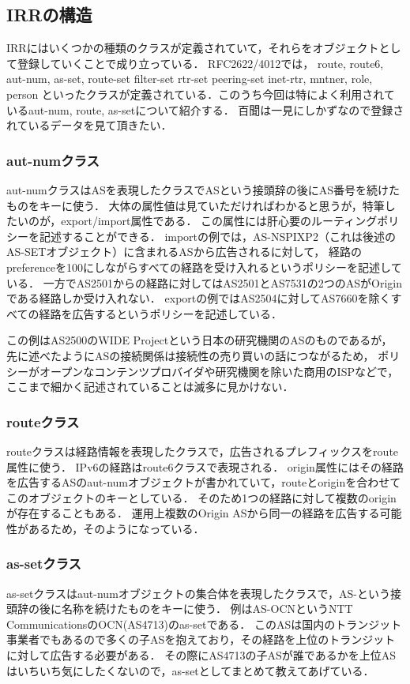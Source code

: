 \subsection{IRRの構造}

IRRにはいくつかの種類のクラスが定義されていて，それらをオブジェクトとして登録していくことで成り立っている．
RFC2622/4012では，
route, route6, aut-num, as-set, route-set filter-set rtr-set peering-set inet-rtr, mntner, role, person
といったクラスが定義されている．このうち今回は特によく利用されているaut-num, route, as-setについて紹介する．
百聞は一見にしかずなので登録されているデータを見て頂きたい．

\subsubsection{aut-numクラス}
aut-numクラスはASを表現したクラスでASという接頭辞の後にAS番号を続けたものをキーに使う．
大体の属性値は見ていただければわかると思うが，特筆したいのが，export/import属性である．
この属性には肝心要のルーティングポリシーを記述することができる．
importの例では，AS-NSPIXP2（これは後述のAS-SETオブジェクト）に含まれるASから広告されるに対して，
経路のpreferenceを100にしながらすべての経路を受け入れるというポリシーを記述している．
一方でAS2501からの経路に対してはAS2501とAS7531の2つのASがOriginである経路しか受け入れない．
exportの例ではAS2504に対してAS7660を除くすべての経路を広告するというポリシーを記述している．

この例はAS2500のWIDE Projectという日本の研究機関のASのものであるが，
先に述べたようにASの接続関係は接続性の売り買いの話につながるため，
ポリシーがオープンなコンテンツプロバイダや研究機関を除いた商用のISPなどで，
ここまで細かく記述されていることは滅多に見かけない．

\subsubsection{routeクラス}
routeクラスは経路情報を表現したクラスで，広告されるプレフィックスをroute属性に使う．
IPv6の経路はroute6クラスで表現される．
origin属性にはその経路を広告するASのaut-numオブジェクトが書かれていて，routeとoriginを合わせてこのオブジェクトのキーとしている．
そのため1つの経路に対して複数のoriginが存在することもある．
運用上複数のOrigin ASから同一の経路を広告する可能性があるため，そのようになっている．

\subsubsection{as-setクラス}
as-setクラスはaut-numオブジェクトの集合体を表現したクラスで，AS-という接頭辞の後に名称を続けたものをキーに使う．
例はAS-OCNというNTT CommunicationsのOCN(AS4713)のas-setである．
このASは国内のトランジット事業者でもあるので多くの子ASを抱えており，その経路を上位のトランジットに対して広告する必要がある．
その際にAS4713の子ASが誰であるかを上位ASはいちいち気にしたくないので，as-setとしてまとめて教えてあげている．

